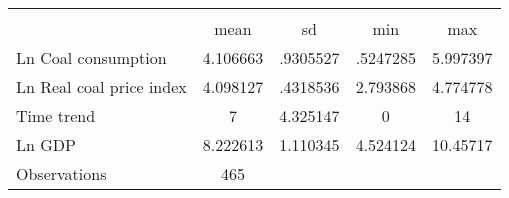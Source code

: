 {
\def\sym#1{\ifmmode^{#1}\else\(^{#1}\)\fi}
\begin{tabular}{l*{1}{cccc}}
\hline\hline
                    &\multicolumn{4}{c}{}                               \\
                    &        mean&          sd&         min&         max\\
\hline
Ln Coal consumption &    4.106663&    .9305527&    .5247285&    5.997397\\
Ln Real coal price index&    4.098127&    .4318536&    2.793868&    4.774778\\
Time trend          &           7&    4.325147&           0&          14\\
Ln GDP              &    8.222613&    1.110345&    4.524124&    10.45717\\
\hline
Observations        &         465&            &            &            \\
\hline\hline
\end{tabular}
}
